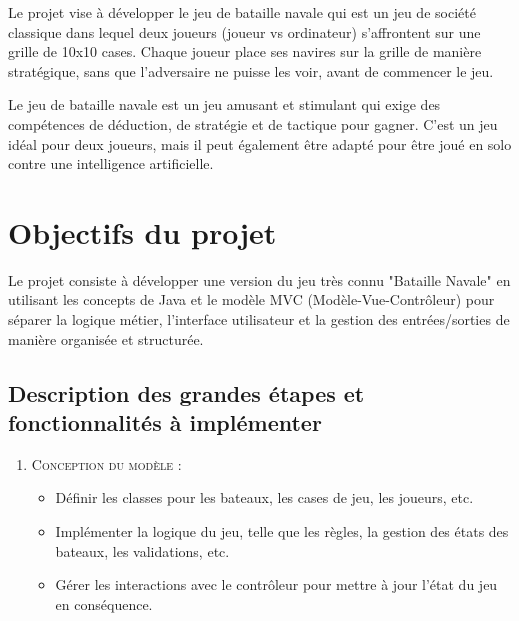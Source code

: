\documentclass{rapport}
\begin{document}
\large{Le projet vise à développer le jeu de bataille navale qui est un jeu de société classique dans lequel deux joueurs (joueur vs ordinateur) s'affrontent sur une grille de 10x10 cases. Chaque joueur place ses navires sur la grille de manière stratégique, sans que l'adversaire ne puisse les voir, avant de commencer le jeu.







Le jeu de bataille navale est un jeu amusant et stimulant qui exige des compétences de déduction, de stratégie et de tactique pour gagner. C'est un jeu idéal pour deux joueurs, mais il peut également être adapté pour être joué en solo contre une intelligence artificielle.



\section{Objectifs du projet}


Le projet consiste à développer une version du jeu très connu "Bataille Navale" en utilisant les concepts de Java et le modèle MVC (Modèle-Vue-Contrôleur) pour séparer la logique métier, l'interface utilisateur et la gestion des entrées/sorties de manière organisée et structurée.



\subsection{Description des grandes étapes et fonctionnalités à implémenter}


\begin{enumerate}




\item \textsc{Conception du modèle} :


\begin{itemize}


\item Définir les classes pour les bateaux, les cases de jeu, les joueurs, etc.


\item Implémenter la logique du jeu, telle que les règles, la gestion des états des bateaux, les validations, etc.


\item Gérer les interactions avec le contrôleur pour mettre à jour l'état du jeu en conséquence.



\end{itemize}
\end{enumerate}}
\end{document}
